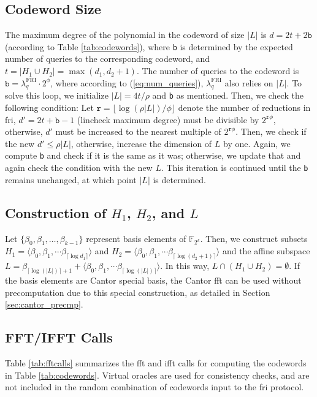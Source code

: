 \subsection{Codeword Size}
The maximum degree of the polynomial in the codeword of size $|L|$ is $d = 2t+2\texttt{b}$ (according to Table \ref{tab:codewords}), where \texttt{b} is determined by the expected number of queries to the corresponding codeword, and $t = |H_1 \cup H_2| = \max(d_1, d_2+1)$.
The number of queries to the codeword is $\texttt{b} = \lambda_q^\text{FRI} \cdot 2^{\phi}$, where according to (\ref{eq:num_queries}), $\lambda_q^\text{FRI}$ also relies on $|L|$. To solve this loop, we initialize $|L| = 4t/\rho$ and \texttt{b} as mentioned. Then, we check the following condition: Let $\texttt{r}=\lfloor\log(\rho|L|)/\phi\rfloor$ denote the number of reductions in \gls{fri},  $d' = 2t + \texttt{b}-1$ (lincheck maximum degree) must be divisible by $2^{\texttt{r}\phi}$, otherwise, $d'$ must be increased to the nearest multiple of $2^{\texttt{r}\phi}$. Then, we check if the new $d' \leq \rho |L|$, otherwise, increase the dimension of $L$ by one. Again, we compute \texttt{b} and check if it is the same as it was; otherwise, we update that and again check the condition with the new $L$. This iteration is continued until the \texttt{b} remains unchanged, at which point $|L|$ is determined.

\subsection{Construction of $H_1$, $H_2$, and $L$}
Let $\{\beta_0, \beta_1, \dots, \beta_{k-1}\}$ represent basis elements of $\mathbb{F}_{2^k}$. Then, we construct subsets  $H_1=\langle \beta_0, \beta_1, \cdots \beta_{\lceil\log{d_1}\rceil} \rangle$ and $H_2 = \langle \beta_0, \beta_1, \cdots \beta_{
	\lceil\log(d_2 + 1)\rceil} \rangle$ and the affine subspace $L= \beta_{
	\lceil\log(|L|)\rceil+1} + \langle \beta_0, \beta_1, \cdots \beta_{
	\lceil\log(|L|)\rceil} \rangle$. In this way,  $L \cap (H_1 \cup H_2) = \emptyset$. If the basis elements are Cantor special basis, the Cantor \gls{fft} can be used without precomputation due to this special construction, as detailed in Section \ref{sec:cantor_precmp}.

\subsection{FFT/IFFT Calls}
Table \ref{tab:fftcalls} summarizes the \gls{fft} and \gls{ifft} calls for computing the codewords in Table \ref{tab:codewords}. Virtual oracles are used for consistency checks, and are not included in the random combination of codewords input to the \gls{fri} protocol.

